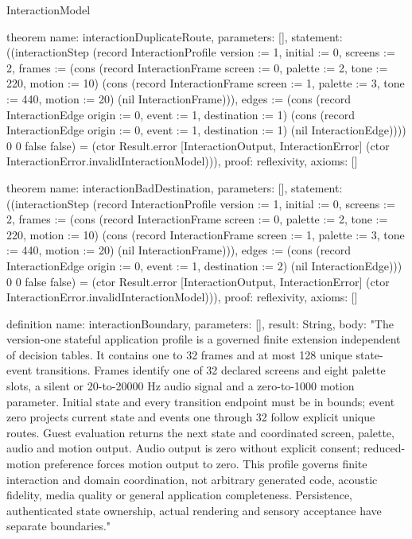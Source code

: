 \begin{lexlean}{InteractionModel}
\begin{semanticmodule}
theorem{
  name: interactionDuplicateRoute,
  parameters: [],
  statement: ((interactionStep (record InteractionProfile {version := 1, initial := 0, screens := 2, frames := (cons (record InteractionFrame {screen := 0, palette := 2, tone := 220, motion := 10}) (cons (record InteractionFrame {screen := 1, palette := 3, tone := 440, motion := 20}) (nil InteractionFrame))), edges := (cons (record InteractionEdge {origin := 0, event := 1, destination := 1}) (cons (record InteractionEdge {origin := 0, event := 1, destination := 1}) (nil InteractionEdge)))}) 0 0 false false) = (ctor Result.error [InteractionOutput, InteractionError] (ctor InteractionError.invalidInteractionModel))),
  proof: reflexivity{},
  axioms: []
}

theorem{
  name: interactionBadDestination,
  parameters: [],
  statement: ((interactionStep (record InteractionProfile {version := 1, initial := 0, screens := 2, frames := (cons (record InteractionFrame {screen := 0, palette := 2, tone := 220, motion := 10}) (cons (record InteractionFrame {screen := 1, palette := 3, tone := 440, motion := 20}) (nil InteractionFrame))), edges := (cons (record InteractionEdge {origin := 0, event := 1, destination := 2}) (nil InteractionEdge))}) 0 0 false false) = (ctor Result.error [InteractionOutput, InteractionError] (ctor InteractionError.invalidInteractionModel))),
  proof: reflexivity{},
  axioms: []
}

definition{
  name: interactionBoundary,
  parameters: [],
  result: String,
  body: "The version-one stateful application profile is a governed finite extension independent of decision tables. It contains one to 32 frames and at most 128 unique state-event transitions. Frames identify one of 32 declared screens and eight palette slots, a silent or 20-to-20000 Hz audio signal and a zero-to-1000 motion parameter. Initial state and every transition endpoint must be in bounds; event zero projects current state and events one through 32 follow explicit unique routes. Guest evaluation returns the next state and coordinated screen, palette, audio and motion output. Audio output is zero without explicit consent; reduced-motion preference forces motion output to zero. This profile governs finite interaction and domain coordination, not arbitrary generated code, acoustic fidelity, media quality or general application completeness. Persistence, authenticated state ownership, actual rendering and sensory acceptance have separate boundaries."
}
\end{semanticmodule}

\end{lexlean}

